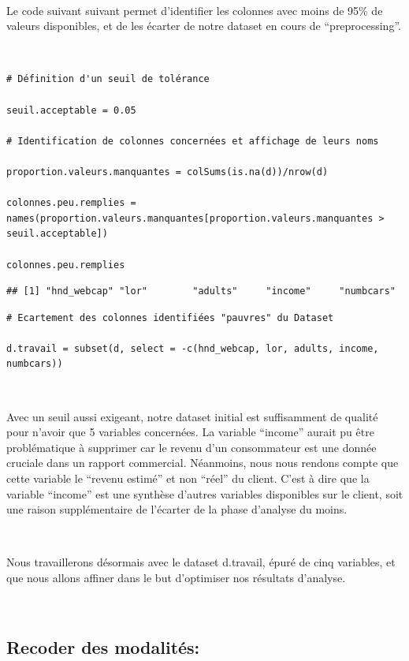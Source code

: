 \documentclass[]{imsart}
\numberwithin{equation}{section}
\theoremstyle{plain}
\begin{document}
~

Le code suivant suivant permet d'identifier les colonnes avec moins de 95\% de valeurs disponibles, et de les écarter de notre dataset en cours de ``preprocessing''.

~

\begin{verbatim}
# Définition d'un seuil de tolérance

seuil.acceptable = 0.05

# Identification de colonnes concernées et affichage de leurs noms

proportion.valeurs.manquantes = colSums(is.na(d))/nrow(d)

colonnes.peu.remplies = 
names(proportion.valeurs.manquantes[proportion.valeurs.manquantes > seuil.acceptable])

colonnes.peu.remplies
\end{verbatim}

\begin{verbatim}
## [1] "hnd_webcap" "lor"        "adults"     "income"     "numbcars"
\end{verbatim}

\begin{verbatim}
# Ecartement des colonnes identifiées "pauvres" du Dataset 

d.travail = subset(d, select = -c(hnd_webcap, lor, adults, income, numbcars))
\end{verbatim}

~

Avec un seuil aussi exigeant, notre dataset initial est suffisamment de qualité pour n'avoir que 5 variables concernées. La variable ``income'' aurait pu être problématique à supprimer car le revenu d'un consommateur est une donnée cruciale dans un rapport commercial. Néanmoins, nous nous rendons compte que cette variable le ``revenu estimé'' et non ``réel'' du client. C'est à dire que la variable ``income'' est une synthèse d'autres variables disponibles sur le client, soit une raison supplémentaire de l'écarter de la phase d'analyse du moins.

~

Nous travaillerons désormais avec le dataset d.travail, épuré de cinq variables, et que nous allons affiner dans le but d'optimiser nos résultats d'analyse.

~

\hypertarget{recoder-des-modalituxe9s}{%
\subsection{Recoder des modalités:}\label{recoder-des-modalituxe9s}}
\end{document}
